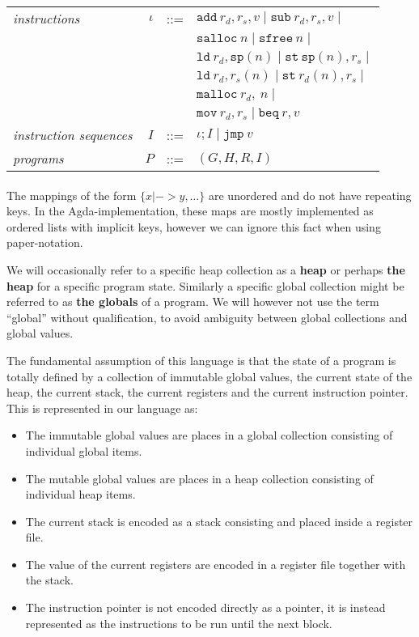 \begin{tabular}{lrcl}
\\
\textit{instructions} & $\iota$ & ::= & $\mathtt{add}\ r_d, r_s, v \mid \mathtt{sub}\ r_d, r_s, v \mid$ \\
        &&& $\mathtt{salloc}\ n \mid \mathtt{sfree}\ n \mid$ \\
        &&& $\mathtt{ld}\ r_d, \mathtt{sp}(n) \mid \mathtt{st}\ \mathtt{sp}(n), r_s \mid$\\
        &&& $\mathtt{ld}\ r_d, r_s(n) \mid \mathtt{st}\ r_d(n), r_s \mid$\\
        &&& $\mathtt{malloc}\ r_d,\ n \mid $ \\
        &&& $\mathtt{mov}\ r_d, r_s \mid \mathtt{beq}\ r, v$ \\
\textit{instruction sequences} & $I$ & ::= & $\iota ; I \mid \mathtt{jmp}\ v$ \\
\textit{programs} & $P$ & ::= & $(G, H, R, I)$ \\
\end{tabular}

\paragraph{}
The mappings of the form $\{x |-> y, \dots\}$ are unordered and do not have
repeating keys. In the Agda-implementation, these maps are mostly implemented as
ordered lists with implicit keys, however we can ignore this fact when using
paper-notation.

We will occasionally refer to a specific heap collection as a \textbf{heap} or
perhaps \textbf{the heap} for a specific program state. Similarly a specific
global collection might be referred to as \textbf{the globals} of a program. We
will however not use the term ``global'' without qualification, to avoid
ambiguity between global collections and global values.

The fundamental assumption of this language is that the state of a program is
totally defined by a collection of immutable global values, the current state of
the heap, the current stack, the current registers and the current instruction
pointer. This is represented in our language as:

\begin{itemize}
\item The immutable global values are places in a global collection
  consisting of individual global items.
\item The mutable global values are places in a heap collection
  consisting of individual heap items.
\item The current stack is encoded as a stack consisting and placed inside a
  register file.
\item The value of the current registers are encoded in a register file together
  with the stack.
\item The instruction pointer is not encoded directly as a pointer, it is
  instead represented as the instructions to be run until the next block.
\end{itemize}

